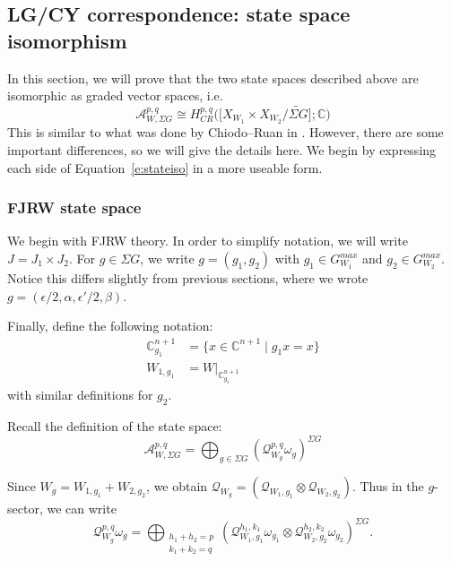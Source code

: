 \documentclass[10pt, letterpaper]{amsart}
\theoremstyle{remark}
\newcommand{\CC}{\mathbb C}
\newcommand{\sA}{\mathscr{A}}
\newcommand{\sQ}{\mathscr{Q}}
\newcommand{\set}[1]{\{#1\}}
\newcommand{\s}[1]{\Sigma #1}
\begin{document}
\subsection{LG/CY correspondence: state space isomorphism}\label{ss:LGCYstatespace}

In this section, we will prove that the two state spaces described above are isomorphic as graded vector spaces, i.e. 
\begin{equation}\label{e:stateiso}
\sA_{W,\s{G}}^{p,q}\cong H_{CR}^{p,q}\Big(\big[X_{W_1}\times X_{W_2}/\widetilde{\s{G}} \big];\CC\Big) 
\end{equation}
This is similar to what was done by Chiodo--Ruan in \cite{ChR}. However, there are some important differences, so we will give the details here. 
We begin by expressing each side of Equation~\eqref{e:stateiso} in a more useable form. 



\subsubsection{FJRW state space} 
We begin with FJRW theory. 
In order to simplify notation, we will write $J=J_1\times J_2$. For $g\in \s{G}$, we write $g=(g_1,g_2)$ with $g_1\in G_{W_1}^{max}$ and $g_2\in G_{W_2}^{max}$. Notice this differs slightly from previous sections, where we wrote $g=(\epsilon/2,\alpha,\epsilon'/2,\beta)$. 

Finally, define the following notation:
\begin{align*}
\CC^{n+1}_{g_1}&=\set{x\in \CC^{n+1}\mid g_1x=x}\\
W_{1,g_1}&=W|_{\CC^{n+1}_{g_1}}
\end{align*}
with similar definitions for $g_2$. 

Recall the definition of the state space:
\begin{equation}\label{e:fjrwstatespacereview}
\sA^{p,q}_{W,\s{G}}=\bigoplus_{g\in\s{G}}(\sQ_{W_g}^{p,q}\omega_g)^{\s{G}}
\end{equation}

Since $W_g=W_{1,g_1}+W_{2,g_2}$, we obtain $\sQ_{W_g}=(\sQ_{W_1,g_1}\otimes \sQ_{W_2,g_2})$. 
Thus in the $g$-sector, we can write 
\begin{equation}\label{e:fjrwtensor}
\sQ_{W_g}^{p,q}\omega_g=\bigoplus_{\substack{h_1+h_2=p\\k_1+k_2=q}}(\sQ^{h_1,k_1}_{W_1,g_1}\omega_{g_1}\otimes \sQ^{h_2,k_2}_{W_2,g_2}\omega_{g_2})^{\s{G}}.
\end{equation}
\end{document}
